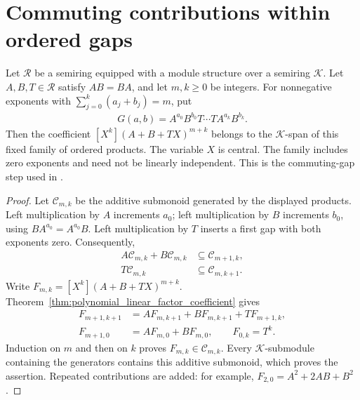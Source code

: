 \section{Commuting contributions within ordered gaps}

\begin{theorem}
    \label{thm:polynomial_commuting_gap_span}
    \leanok
    Let $\mathcal R$ be a semiring equipped with a module structure over a
    semiring $\mathcal K$. Let $A,B,T\in\mathcal R$ satisfy $AB=BA$, and let
    $m,k\ge0$ be integers. For nonnegative exponents with
    $\sum_{j=0}^{k}(a_j+b_j)=m$, put
    \begin{align*}
        G(a,b)=A^{a_0}B^{b_0}T\cdots T A^{a_k}B^{b_k}.
    \end{align*}
    Then the coefficient $[X^k](A+B+TX)^{m+k}$ belongs to the
    $\mathcal K$-span of this fixed family of ordered products.
    The variable $X$ is central. The family includes zero exponents and
    need not be linearly independent.
    This is the commuting-gap step used in
    \cite[Lemma~4.2]{Arad2013AreaLaw}.
\end{theorem}
\begin{proof}
    \leanok
    Let $\mathcal C_{m,k}$ be the additive submonoid generated by the displayed
    products. Left multiplication by $A$ increments $a_0$; left multiplication
    by $B$ increments $b_0$, using $BA^{a_0}=A^{a_0}B$. Left multiplication by
    $T$ inserts a first gap with both exponents zero. Consequently,
    \begin{align*}
        A\mathcal C_{m,k}+B\mathcal C_{m,k}
            &\subseteq\mathcal C_{m+1,k}, \\
        T\mathcal C_{m,k}&\subseteq\mathcal C_{m,k+1}.
    \end{align*}
    Write $F_{m,k}=[X^k](A+B+TX)^{m+k}$.
    Theorem~\ref{thm:polynomial_linear_factor_coefficient} gives
    \begin{align*}
        F_{m+1,k+1}&=AF_{m,k+1}+BF_{m,k+1}+TF_{m+1,k}, \\
        F_{m+1,0}&=AF_{m,0}+BF_{m,0},\qquad F_{0,k}=T^k.
    \end{align*}
    Induction on $m$ and then on $k$ proves $F_{m,k}\in\mathcal C_{m,k}$.
    Every $\mathcal K$-submodule containing the generators contains this
    additive submonoid, which proves the assertion.
    Repeated contributions are added: for example, $F_{2,0}=A^2+2AB+B^2$.
\end{proof}

